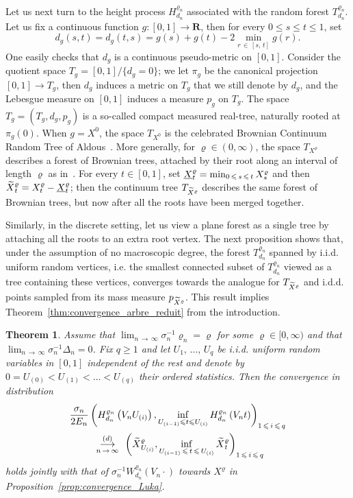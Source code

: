 \documentclass[10pt]{amsart}
\newtheorem{theo}{Theorem}[section]
\theoremstyle{definition}\newtheorem{defi}[theo]{Definition}\newtheorem{rema}[theo]{Remark}\newtheorem{exam}[theo]{Example}\newtheorem{exem}[theo]{Example}\newtheorem{nota}[theo]{Notation}
\newcommand{\ensembles}[1]{\mathbf{#1}}
\newcommand{\R}{\ensembles{R}}
\newcommand{\1}{\ensembles{1}}
\newcommand{\tildep}[1]{\widetilde{#1}\vphantom{#1}}
\newcommand{\underlinep}[1]{\underline{#1}\vphantom{#1}}
\renewcommand{\le}{\leqslant}
\renewcommand{\ge}{\geqslant}
\newcommand{\CRT}{T}
\newcommand{\dCRT}{d}
\newcommand{\pCRT}{p}
\newcommand{\fn}{T_{d_n}^{\varrho_n}}
\newcommand{\Wfn}{W_{d_n}^{\varrho_n}}
\newcommand{\Hfn}{H_{d_n}^{\varrho_n}}
\newcommand{\tX}{\tildep{X}^{\varrho}}
\newcommand{\edges}{E}
\newcommand{\vertices}{V}
\newcommand{\cvloi}[1][n]{\enskip\mathop{\longrightarrow}^{(d)}_{#1\,\to\, \infty}\enskip}
\providecommand{\?}{}
\begin{document}
Let us next turn to the height process $\Hfn$ associated with the random forest $\fn$. Let us fix a continuous function $g : [0,1] \to \R$, then for every $0 \le s \le t \le 1$, set
\[
\dCRT_g(s,t) = \dCRT_g(t,s) = g(s) + g(t) - 2 \min_{r\,\in\,[s,\,t]} g(r).
\]
One easily checks that $\dCRT_g$ is a continuous pseudo-metric on $[0,1]$. Consider the quotient space $\CRT_g = [0,1] / \{\dCRT_g = 0\}$; we let $\pi_g$ be the canonical projection $[0,1] \to \CRT_g$, then $\dCRT_g$ induces a metric on $\CRT_g$ that we still denote by $\dCRT_g$, and the Lebesgue measure on $[0,1]$ induces a measure $\pCRT_g$ on $\CRT_g$. The space $\CRT_g = (\CRT_g, \dCRT_g, \pCRT_g)$ is a so-called compact measured real-tree, naturally rooted at $\pi_g(0)$. When $g = X^0$, the space $\CRT_{X^0}$ is the celebrated Brownian Continuum Random Tree of Aldous~\cite{Ald93}. More generally, for $\varrho \in (0,\infty)$, the space $\CRT_{X^\varrho}$ describes a forest of Brownian trees, attached by their root along an interval of length $\varrho$ as in~\cite{BM17}. For every $t \in [0,1]$, set $\underlinep{X}^\varrho_t = \min_{0\,\le\,s\, \le\,t} X^\varrho_s$ and then $\tX_t = X^\varrho_t-\underlinep{X}^\varrho_t$; then the continuum tree $\CRT_{\tX}$ describes the same forest of Brownian trees, but now after all the roots have been merged together.

Similarly, in the discrete setting, let us view a plane forest as a single tree by attaching all the roots to an extra root vertex. The next proposition shows that, under the assumption of no macroscopic degree, the forest $\fn$ spanned by i.i.d. uniform random vertices, i.e. the smallest connected subset of $\fn$ viewed as a tree containing these vertices, converges towards the analogue for $\CRT_{\tX}$ and i.d.d. points sampled from its mass measure $\pCRT_{\tX}$. This result implies Theorem~\ref{thm:convergence_arbre_reduit} from the introduction.


\begin{theo}\label{thm:marginales_hauteur}
Assume that $\lim_{n\,\to\,\infty} \sigma_n^{-1} \varrho_n = \varrho$ for some $\varrho \in [0,\infty)$ and that $\lim_{n\,\to\,\infty} \sigma_n^{-1} \Delta_n = 0$. Fix $q \ge 1$ and let $U_1,\,\dots,\,U_q$ be i.i.d. uniform random variables in $[0,1]$ independent of the rest and denote by $0 = U_{(0)} < U_{(1)} < \dots < U_{(q)}$ their ordered statistics. Then the convergence in distribution
\begin{multline*}
\frac{\sigma_n}{2 \edges_n} \left(\Hfn\left(\vertices_n U_{(i)}\right), \inf_{U_{(i-1)} \le t \le U_{(i)}} \Hfn\left(\vertices_n t\right)\right)_{1\,\le\,i\,\le\,q}\\
\cvloi
\left(\tX_{U_{(i)}}, \inf_{U_{(i-1)}\,\le\,t \,\le\,U_{(i)}} \tX_t\right)_{1\,\le\,i\,\le\,q}
\end{multline*}
holds jointly with that of $\sigma_n^{-1} \Wfn(\vertices_n \cdot)$ towards $X^\varrho$ in Proposition~\ref{prop:convergence_Luka}.
\end{theo}
\end{document}

